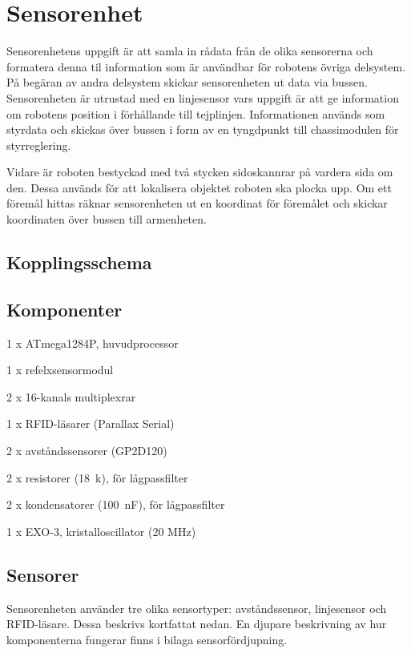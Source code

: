 \section{Sensorenhet}
Sensorenhetens uppgift är att samla in rådata från de olika sensorerna och formatera denna til information som är användbar för robotens övriga delsystem. På begäran av andra delsystem skickar sensorenheten ut data via bussen. Sensorenheten är utrustad
med en linjesensor vars uppgift är att ge information om robotens position i förhållande till tejplinjen. Informationen används som styrdata och skickas över bussen i form av en tyngdpunkt till chassimodulen för styrreglering.

Vidare är roboten bestyckad med två stycken sidoskannrar på vardera sida om den. Dessa används för att lokalisera objektet roboten ska plocka upp. Om ett föremål hittas räknar sensorenheten ut en koordinat för föremålet och skickar koordinaten över bussen till armenheten.

\subsection{Kopplingsschema}

\subsection{Komponenter}
\begin{packed_itemize}
\item 1 x ATmega1284P, huvudprocessor
\item 1 x refelxsensormodul
\item 2 x 16-kanals multiplexrar
\item 1 x RFID-läsarer (Parallax Serial)
\item 2 x avståndssensorer (GP2D120)
\item 2 x resistorer (18~k\ohm), för lågpassfilter
\item 2 x kondensatorer (100~nF), för lågpassfilter
\item 1 x EXO-3, kristalloscillator (20 MHz)
\end{packed_itemize}

\subsection{Sensorer}
Sensorenheten använder tre olika sensortyper: avståndssensor, linjesensor och RFID-läsare.
Dessa beskrivs kortfattat nedan. En djupare beskrivning av hur komponenterna fungerar finns i bilaga sensorfördjupning.

